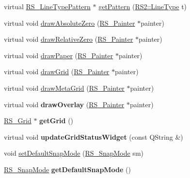 \begin{DoxyCompactItemize}
\item 
virtual \hyperlink{classRS__LineTypePattern}{R\-S\-\_\-\-Line\-Type\-Pattern} $\ast$ \hyperlink{classRS__GraphicView_a75c25e51066e7b87d43b60f98e44ed13}{get\-Pattern} (\hyperlink{classRS2_a6f3a82972c2d62456f6cacb74e14c95f}{R\-S2\-::\-Line\-Type} t)
\item 
virtual void \hyperlink{classRS__GraphicView_ab405b9c7ed73bcd849747ee8e8d5d924}{draw\-Absolute\-Zero} (\hyperlink{classRS__Painter}{R\-S\-\_\-\-Painter} $\ast$painter)
\item 
virtual void \hyperlink{classRS__GraphicView_a091a2986911f98c4adceee14ae7867df}{draw\-Relative\-Zero} (\hyperlink{classRS__Painter}{R\-S\-\_\-\-Painter} $\ast$painter)
\item 
virtual void \hyperlink{classRS__GraphicView_aaa5538c390accf5e46a31a0c8facbafd}{draw\-Paper} (\hyperlink{classRS__Painter}{R\-S\-\_\-\-Painter} $\ast$painter)
\item 
virtual void \hyperlink{classRS__GraphicView_a7846ccb301bca583ec23428ec2187f53}{draw\-Grid} (\hyperlink{classRS__Painter}{R\-S\-\_\-\-Painter} $\ast$painter)
\item 
virtual void \hyperlink{classRS__GraphicView_a6eb5daa3d2114f30ef67631dc4f8580c}{draw\-Meta\-Grid} (\hyperlink{classRS__Painter}{R\-S\-\_\-\-Painter} $\ast$painter)
\item 
\hypertarget{classRS__GraphicView_ace0fdf9d18ce9af9c25807d58f5841fa}{virtual void {\bfseries draw\-Overlay} (\hyperlink{classRS__Painter}{R\-S\-\_\-\-Painter} $\ast$painter)}\label{classRS__GraphicView_ace0fdf9d18ce9af9c25807d58f5841fa}

\item 
\hypertarget{classRS__GraphicView_a09032f5b3d9300727f04abd3cc5e2074}{\hyperlink{classRS__Grid}{R\-S\-\_\-\-Grid} $\ast$ {\bfseries get\-Grid} ()}\label{classRS__GraphicView_a09032f5b3d9300727f04abd3cc5e2074}

\item 
\hypertarget{classRS__GraphicView_aa3d519067ecf29a42b32a86c1700e02f}{virtual void {\bfseries update\-Grid\-Status\-Widget} (const Q\-String \&)}\label{classRS__GraphicView_aa3d519067ecf29a42b32a86c1700e02f}

\item 
void \hyperlink{classRS__GraphicView_a9aa81c654960c6f3c6842d163af9fa9d}{set\-Default\-Snap\-Mode} (\hyperlink{structRS__SnapMode}{R\-S\-\_\-\-Snap\-Mode} sm)
\item 
\hypertarget{classRS__GraphicView_a4ff6971a07df5a73543242f33b0536e3}{\hyperlink{structRS__SnapMode}{R\-S\-\_\-\-Snap\-Mode} {\bfseries get\-Default\-Snap\-Mode} ()}\label{classRS__GraphicView_a4ff6971a07df5a73543242f33b0536e3}


\end{DoxyCompactItemize}
